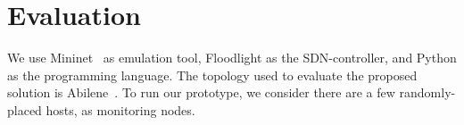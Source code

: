 \documentclass[10pt, journal, letterpaper]{IEEEtran}
\begin{document}
\section{Evaluation}\label{sec:evaluation}
We use Mininet~\cite{kaur2014mininet} as emulation tool, Floodlight as the SDN-controller, and Python as the programming language. The topology used to evaluate the proposed solution is Abilene~\cite{topologyzoo}. To run our prototype, we consider there are a few randomly-placed hosts, as monitoring nodes. %


\end{document}
